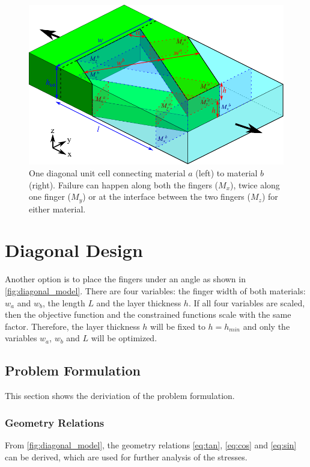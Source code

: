 
\begin{figure}[H]
	\centering
	\includegraphics[width=\columnwidth]{sources/method/diagonal_model_v3.pdf}
	\caption{
		One diagonal unit cell connecting material $a$ (left) to material $b$ (right).
		Failure can happen along both the fingers ($M_x$), twice along one finger ($M_y$) or at the interface between the two fingers ($M_z$) for either material.}
	\label{fig:diagonal_model}
\end{figure}



\section{Diagonal Design}

Another option is to place the fingers under an angle as shown in \autoref{fig:diagonal_model}.
There are four variables: the finger width of both materials: $w_a$ and $w_b$, the length $L$ and the layer thickness $h$. If all four variables are scaled, then the objective function and the constrained functions scale with the same factor. Therefore, the layer thickness $h$ will be fixed to $h = h_{min}$ and only the variables $w_a$, $w_b$ and $L$ will be optimized.

\subsection{Problem Formulation}
This section shows the deriviation of the problem formulation.

\subsubsection{Geometry Relations}
From \autoref{fig:diagonal_model}, the geometry relations \ref{eq:tan}, \ref{eq:cos} and \ref{eq:sin} can be derived, which are used for further analysis of the stresses.

